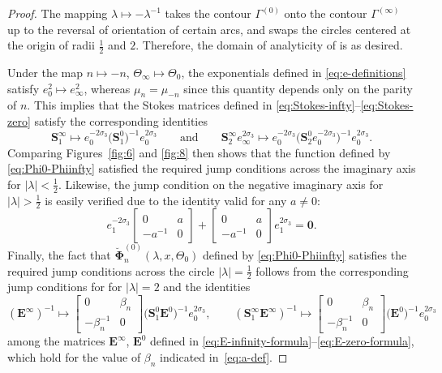 \documentclass[pdftex]{sigma}
\numberwithin{equation}{section}
\newcommand{\para}[1]{\breve{#1}}
\begin{document}
\begin{proof}
The mapping $\lambda\mapsto -\lambda^{-1}$ takes the contour $\Gamma^{(0)}$ onto the contour $\Gamma^{(\infty)}$ up to the reversal of orientation of certain arcs, and swaps the circles centered at the origin of radii $\frac{1}{2}$ and $2$. Therefore, the domain of analyticity of \smash{$\para{\mathbf{\Phi}}^{(0)}_n(\lambda,x, \Theta_0)$} is as desired.

Under the map $n \mapsto -n$, $\Theta_\infty \mapsto \Theta_0$, the exponentials defined in \eqref{eq:e-definitions} satisfy $e_{0}^2 \mapsto e_{\infty}^2$, whereas $\mu_n = \mu_{-n}$ since this quantity depends only on the parity of $n$. This implies that the Stokes matrices defined in \eqref{eq:Stokes-infty}--\eqref{eq:Stokes-zero} satisfy the corresponding identities
\begin{equation*}
 \mathbf{S}^\infty_1 \mapsto e_0^{-2\sigma_3}\big(\mathbf{S}^0_{1}\big)^{-1}e_0^{2\sigma_3} \qquad\text{and}\qquad
 \mathbf{S}^\infty_{{2}}e_\infty^{2\sigma_3} \mapsto e_0^{-2\sigma_3}\big(\mathbf{S}^0_{2} e_0^{-2\sigma_3}\big)^{-1} e_0^{2\sigma_3}.
\end{equation*}
Comparing Figures~\ref{fig:6} and \ref{fig:8} then shows that the function defined by \eqref{eq:Phi0-Phiinfty} satisfied the required jump conditions across the imaginary axis for $|\lambda|<\frac{1}{2}$. Likewise, the jump condition on the negative imaginary axis for $|\lambda|>\frac{1}{2}$ is easily verified due to the identity valid for any $a\neq 0$:
\begin{equation*}
 e_1^{-2 \sigma_3}\begin{bmatrix}0&a\\-a^{-1} & 0\end{bmatrix} +\begin{bmatrix}0 & a\\-a^{-1} & 0\end{bmatrix}e_1^{2 \sigma_3}=\mathbf{0}.
\end{equation*}
Finally, the fact that $\para{\mathbf{\Phi}}^{(0)}_n(\lambda,x, \Theta_0)$ defined by \eqref{eq:Phi0-Phiinfty} satisfies the required jump conditions across the circle $|\lambda|=\frac{1}{2}$ follows from the corresponding jump conditions for \smash{$\para{\mathbf{\Phi}}^{(\infty)}_{1-n}(\lambda,x, \Theta_0)$} for $|\lambda|=2$ and the identities
\begin{equation*}
 (\mathbf{E}^{\infty})^{-1} \mapsto \begin{bmatrix}0 & \beta_n\\-\beta_n^{-1} & 0\end{bmatrix} \big(\mathbf{S}_1^0 \mathbf{E}^0\big)^{-1} e_0^{2\sigma_3}, \qquad(\mathbf{S}_1^\infty \mathbf{E}^{\infty})^{-1} \mapsto \begin{bmatrix}0 & \beta_n\\-\beta_n^{-1} & 0\end{bmatrix} \big( \mathbf{E}^0\big)^{-1} e_0^{2\sigma_3}
\end{equation*}
among the matrices $\mathbf{E}^\infty$, $\mathbf{E}^0$ defined in \eqref{eq:E-infinity-formula}--\eqref{eq:E-zero-formula}, which hold for the value of $\beta_n$ indicated in~\eqref{eq:a-def}.


\end{proof}
\end{document}

